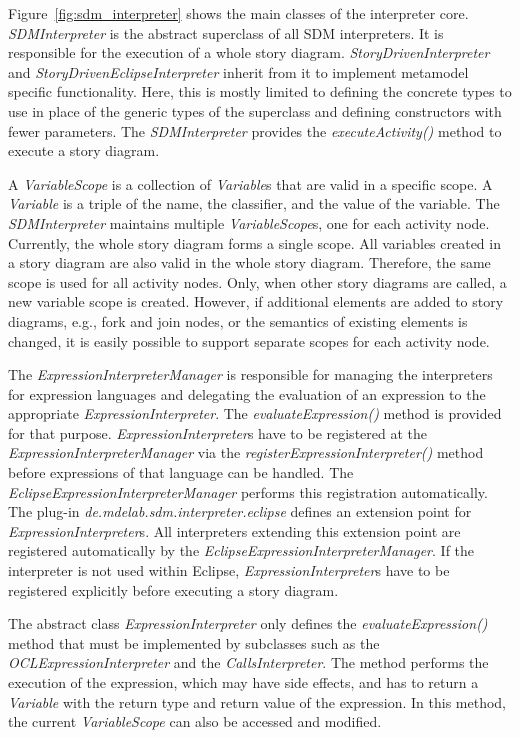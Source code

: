 Figure~\ref{fig:sdm_interpreter} shows the main classes of the interpreter core. 
\emph{SDMInterpreter} is the abstract superclass of all SDM interpreters. 
It is responsible for the execution of a whole story diagram. 
\emph{StoryDrivenInterpreter} and \emph{StoryDrivenEclipseInterpreter} inherit from it to implement metamodel specific functionality. 
Here, this is mostly limited to defining the concrete types to use in place of the generic types of the superclass and defining constructors with fewer parameters. 
The \emph{SDMInterpreter} provides the \emph{executeActivity()} method to execute a story diagram.

A \emph{VariableScope} is a collection of \emph{Variable}s that are valid in a specific scope.
A \emph{Variable} is a triple of the name, the classifier, and the value of the variable.
The \emph{SDMInterpreter} maintains multiple \emph{VariableScope}s, one for each activity node.
Currently, the whole story diagram forms a single scope.
All variables created in a story diagram are also valid in the whole story diagram. 
Therefore, the same scope is used for all activity nodes.
Only, when other story diagrams are called, a new variable scope is created. 
However, if additional elements are added to story diagrams, e.g., fork and join nodes, or the semantics of existing elements is changed, it is easily possible to support separate scopes for each activity node.

The \emph{ExpressionInterpreterManager} is responsible for managing the interpreters for expression languages and delegating the evaluation of an expression to the appropriate \emph{ExpressionInterpreter}. 
The \emph{evaluateExpression()} method is provided for that purpose. 
\emph{ExpressionInterpreter}s have to be registered at the \emph{ExpressionInterpreterManager} via the \emph{registerExpressionInterpreter()} method before expressions of that language can be handled. 
The \emph{EclipseExpressionInterpreterManager} performs this registration automatically. 
The plug-in \emph{de.mdelab.sdm.interpreter.eclipse} defines an extension point for \emph{ExpressionInterpreter}s. 
All interpreters extending this extension point are registered automatically by the \emph{EclipseExpressionInterpreterManager}. 
If the interpreter is not used within Eclipse, \emph{ExpressionInterpreter}s have to be registered explicitly before executing a story diagram.

The abstract class \emph{ExpressionInterpreter} only defines the \emph{evaluateExpression()} method that must be implemented by subclasses such as the \emph{OCLExpressionInterpreter} and the \emph{CallsInterpreter}. 
The method performs the execution of the expression, which may have side effects, and has to return a \emph{Variable} with the return type and return value of the expression. 
In this method, the current \emph{VariableScope} can also be accessed and modified.


